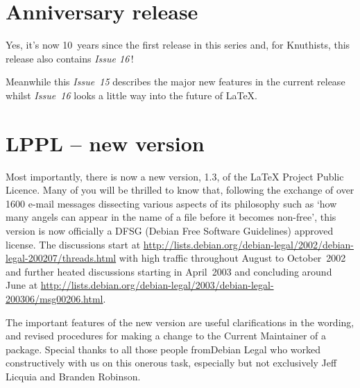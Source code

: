 \documentclass{ltnews}
\begin{document}
\maketitle


\section{Anniversary release}

Yes, it's now 10~years since the first release in this series and, for
Knuthists, this release also contains \textit{Issue 16}\,!

Meanwhile  this \textit{Issue~15} describes the major new features in
the current release whilst \textit{Issue~16} looks\newline
a little way into the future of \LaTeX{}.


\section{LPPL -- new version}

Most importantly, there is now a new version, 1.3, of the \LaTeX{}
Project Public Licence.   Many of you will\newline
be thrilled to know that, following the exchange of over 1600 e-mail
messages dissecting various aspects of its philosophy such as `how
many angels can appear in the name of a file before it becomes
non-free', this version\newline
is now officially a DFSG (Debian Free Software Guidelines) approved license.
The discussions start at
\url{http://lists.debian.org/debian-legal/2002/debian-legal-200207/threads.html}
with high traffic throughout August to October~2002 and further
heated discussions starting in April~2003 and concluding
around June at
\url{http://lists.debian.org/debian-legal/2003/debian-legal-200306/msg00206.html}.

The important features of the new version are useful clarifications in
the wording, and revised procedures\newline
for making a change to the Current Maintainer of a package.  Special
thanks to all those people from\newline Debian Legal who worked
constructively with us\newline
on this onerous task, especially but not exclusively\newline
Jeff Licquia and Branden Robinson.
\end{document}
